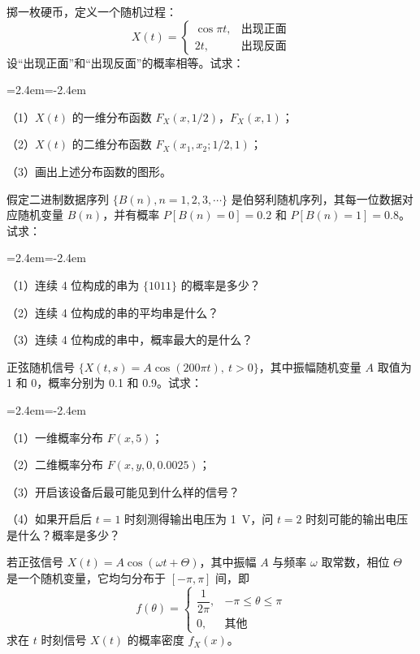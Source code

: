 \documentclass[11pt,openany,UTF8]{ctexbook}
\newenvironment{citemize}
  {\begin{list}{}{\leftmargin=2.4em\itemindent=-2.4em\itemsep=1pt\topsep=3pt\parsep=0pt}}
  {\end{list}}
\newcommand{\exer}[1]{\par\medskip\noindent #1\quad\ignorespaces}
\begin{document}
\exer{2.3}掷一枚硬币\nobreak，定义一个随机过程\nobreak：
\[
X(t)=\begin{cases}
\cos\pi t, & \text{出现正面}\\
2t, & \text{出现反面}
\end{cases}
\]
设“出现正面”和“出现反面”的概率相等\nobreak。试求\nobreak：

\begin{citemize}
\item （1\nobreak）$X(t)$ 的一维分布函数 $F_X(x,1/2)$\nobreak，$F_X(x,1)$\nobreak；
\item （2\nobreak）$X(t)$ 的二维分布函数 $F_X(x_1,x_2;1/2,1)$\nobreak；
\item （3\nobreak）画出上述分布函数的图形\nobreak。
\end{citemize}

\exer{2.4}假定二进制数据序列 $\{B(n),n=1,2,3,\cdots\}$ 是伯努利随机序列\nobreak，其每一位数据对应随机变量 $B(n)$\nobreak，并有概率 $P[B(n)=0]=0.2$ 和 $P[B(n)=1]=0.8$\nobreak。试求\nobreak：

\begin{citemize}
\item （1\nobreak）连续 4 位构成的串为 $\{1011\}$ 的概率是多少\nobreak？
\item （2\nobreak）连续 4 位构成的串的平均串是什么\nobreak？
\item （3\nobreak）连续 4 位构成的串中\nobreak，概率最大的是什么\nobreak？
\end{citemize}

\exer{2.5}正弦随机信号 $\{X(t,s)=A\cos(200\pi t),\ t>0\}$\nobreak，其中振幅随机变量 $A$ 取值为 1 和 0\nobreak，概率分别为 0.1 和 0.9\nobreak。试求\nobreak：

\begin{citemize}
\item （1\nobreak）一维概率分布 $F(x,5)$\nobreak；
\item （2\nobreak）二维概率分布 $F(x,y,0,0.0025)$\nobreak；
\item （3\nobreak）开启该设备后最可能见到什么样的信号\nobreak？
\item （4\nobreak）如果开启后 $t=1$ 时刻测得输出电压为 1~V\nobreak，问 $t=2$ 时刻可能的输出电压是什么\nobreak？概率是多少\nobreak？
\end{citemize}

\exer{2.6}若正弦信号 $X(t)=A\cos(\omega t+\Theta)$\nobreak，其中振幅 $A$ 与频率 $\omega$ 取常数\nobreak，相位 $\Theta$ 是一个随机变量\nobreak，它均匀分布于 $[-\pi,\pi]$ 间\nobreak，即
\[
f(\theta)=\begin{cases}
\dfrac{1}{2\pi}, & -\pi\leqslant\theta\leqslant\pi\\
0, & \text{其他}
\end{cases}
\]
求在 $t$ 时刻信号 $X(t)$ 的概率密度 $f_X(x)$\nobreak。
\end{document}
